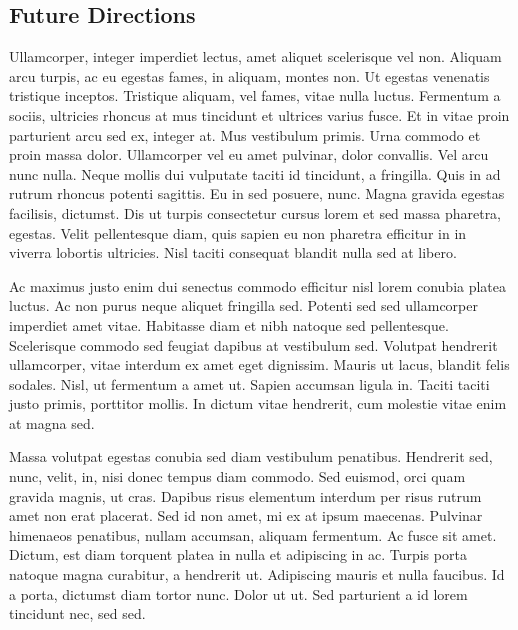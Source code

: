 \documentclass[]{article}
\begin{document}
\hypertarget{future-directions}{%
\subsection{Future Directions}\label{future-directions}}

Ullamcorper, integer imperdiet lectus, amet aliquet scelerisque vel non.
Aliquam arcu turpis, ac eu egestas fames, in aliquam, montes non. Ut
egestas venenatis tristique inceptos. Tristique aliquam, vel fames,
vitae nulla luctus. Fermentum a sociis, ultricies rhoncus at mus
tincidunt et ultrices varius fusce. Et in vitae proin parturient arcu
sed ex, integer at. Mus vestibulum primis. Urna commodo et proin massa
dolor. Ullamcorper vel eu amet pulvinar, dolor convallis. Vel arcu nunc
nulla. Neque mollis dui vulputate taciti id tincidunt, a fringilla. Quis
in ad rutrum rhoncus potenti sagittis. Eu in sed posuere, nunc. Magna
gravida egestas facilisis, dictumst. Dis ut turpis consectetur cursus
lorem et sed massa pharetra, egestas. Velit pellentesque diam, quis
sapien eu non pharetra efficitur in in viverra lobortis ultricies. Nisl
taciti consequat blandit nulla sed at libero.

Ac maximus justo enim dui senectus commodo efficitur nisl lorem conubia
platea luctus. Ac non purus neque aliquet fringilla sed. Potenti sed sed
ullamcorper imperdiet amet vitae. Habitasse diam et nibh natoque sed
pellentesque. Scelerisque commodo sed feugiat dapibus at vestibulum sed.
Volutpat hendrerit ullamcorper, vitae interdum ex amet eget dignissim.
Mauris ut lacus, blandit felis sodales. Nisl, ut fermentum a amet ut.
Sapien accumsan ligula in. Taciti taciti justo primis, porttitor mollis.
In dictum vitae hendrerit, cum molestie vitae enim at magna sed.

Massa volutpat egestas conubia sed diam vestibulum penatibus. Hendrerit
sed, nunc, velit, in, nisi donec tempus diam commodo. Sed euismod, orci
quam gravida magnis, ut cras. Dapibus risus elementum interdum per risus
rutrum amet non erat placerat. Sed id non amet, mi ex at ipsum maecenas.
Pulvinar himenaeos penatibus, nullam accumsan, aliquam fermentum. Ac
fusce sit amet. Dictum, est diam torquent platea in nulla et adipiscing
in ac. Turpis porta natoque magna curabitur, a hendrerit ut. Adipiscing
mauris et nulla faucibus. Id a porta, dictumst diam tortor nunc. Dolor
ut ut. Sed parturient a id lorem tincidunt nec, sed sed.
\end{document}
